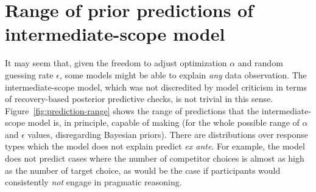 \documentclass[fleqn]{article}
\begin{document}
\section{Range of prior predictions of intermediate-scope model}
\label{sec:range-prior-pred}

It may seem that, given the freedom to adjust optimization $\alpha$ and random guessing rate $\epsilon$, some models might be able to explain \emph{any} data observation.
The intermediate-scope model, which was not discredited by model criticism in terms of recovery-based posterior predictive checks, is not trivial in this sense.
Figure~\ref{fig:prediction-range} shows the range of predictions that the intermediate-scope model is, in principle, capable of making (for the whole possible range of \(\alpha\) and \(\epsilon\) values, disregarding Bayesian priors).
There are distributions over response types which the model does not explain predict \emph{ex ante}.
For example, the model does not predict cases where the number of competitor choices is almost as high as the number of target choice, as would be the case if participants would consistently \emph{not} engage in pragmatic reasoning.
\end{document}
